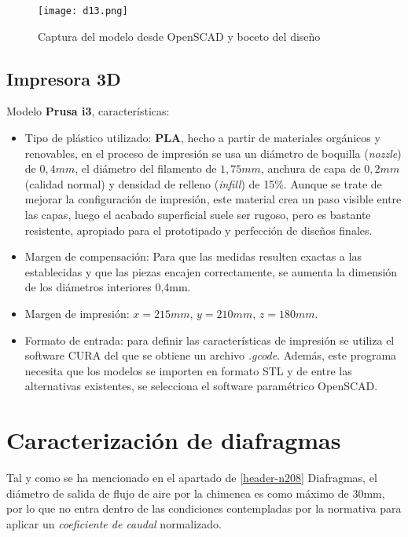 \begin{figure}
\centering
\texttt{[image: d13.png]}
\caption[Modelo diafragma]{Captura del modelo desde OpenSCAD y boceto del diseño}
\label{fig:d13}
\end{figure}

\subsection{Impresora 3D}\label{header-n221}

Modelo \textbf{Prusa i3}, características:

\begin{itemize}
\item
  Tipo de plástico utilizado: \textbf{PLA}, hecho a partir de materiales
  orgánicos y renovables, en el proceso de impresión se usa un diámetro
  de boquilla (\emph{nozzle}) de $0,4 mm$, el diámetro del filamento de
  $1,75 mm$, anchura de capa de $0,2 mm$ (calidad normal) y densidad de
  relleno (\emph{infill}) de 15\%. Aunque se trate de mejorar la
  configuración de impresión, este material crea un paso visible entre
  las capas, luego el acabado superficial suele ser rugoso, pero es
  bastante resistente, apropiado para el prototipado y perfección de
  diseños finales.
\item
  Margen de compensación: Para que las medidas resulten exactas a las
  establecidas y que las piezas encajen correctamente, se aumenta la
  dimensión de los diámetros interiores 0,4mm.
\item
  Margen de impresión: $x = 215 mm$, $y = 210 mm$, $z = 180 mm$.
\item
  Formato de entrada: para definir las características de impresión se
  utiliza el software CURA del que se obtiene un archivo \emph{.gcode}.
  Además, este programa necesita que los modelos se importen en formato
  STL y de entre las alternativas existentes, se selecciona el software
  paramétrico OpenSCAD.
\end{itemize}

\section{Caracterización de diafragmas}\label{header-n239}

Tal y como se ha mencionado en el apartado de \ref{header-n208} Diafragmas, el
diámetro de salida de flujo de aire por la chimenea es como máximo de
30mm, por lo que no entra dentro de las condiciones contempladas por la
normativa para aplicar un \emph{coeficiente de caudal} normalizado.

